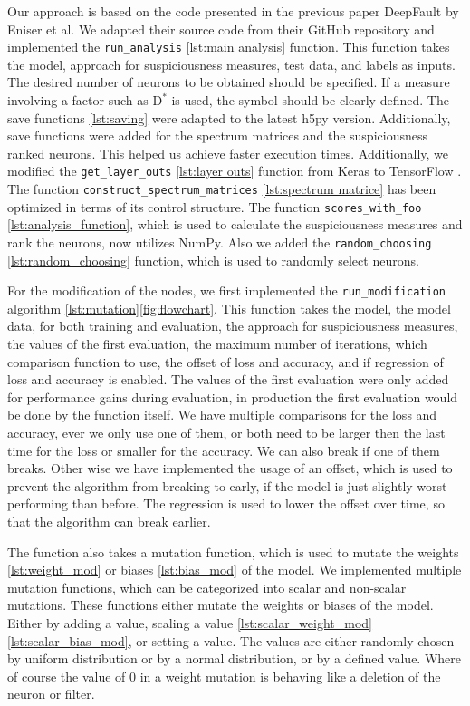 Our approach is based on the code presented in the previous paper DeepFault by Eniser et al. \cite{eniser_deepfault_2019}
We adapted their source code from their GitHub \cite{eniser_deepfault_2023} repository and implemented the \texttt{run\_analysis} \ref{lst:main analysis} function.
This function takes the model, approach for suspiciousness measures, test data, and labels as inputs.
The desired number of neurons to be obtained should be specified.
If a measure involving a factor such as $\text{D}^*$ is used, the symbol should be clearly defined.
The save functions \ref{lst:saving} were adapted to the latest h5py \cite{collette_h5pyh5py_2022} version.
Additionally, save functions were added for the spectrum matrices and the suspiciousness ranked neurons.
This helped us achieve faster execution times.
Additionally, we modified the \texttt{get\_layer\_outs} \ref{lst:layer outs} function from Keras \cite{chollet_keras_2015} to TensorFlow \cite{martin_abadi_tensorflow_2015}.
The function \texttt{construct\_spectrum\_matrices} \ref{lst:spectrum matrice} has been optimized in terms of its control structure.
The function \texttt{scores\_with\_foo} \ref{lst:analysis_function}, which is used to calculate the suspiciousness measures and rank the neurons, now utilizes NumPy.
Also we added the \texttt{random\_choosing} \ref{lst:random_choosing} function, which is used to randomly select neurons.

For the modification of the nodes, we first implemented the \texttt{run\_modification} algorithm \ref{lst:mutation}\ref{fig:flowchart}.
This function takes the model, the model data, for both training and evaluation, the approach for suspiciousness measures, the values of the first evaluation, the maximum number of iterations, which comparison function to use, the offset of loss and accuracy, and if regression of loss and accuracy is enabled.
The values of the first evaluation were only added for performance gains during evaluation, in production the first evaluation would be done by the function itself.
We have multiple comparisons for the loss and accuracy, ever we only use one of them, or both need to be larger then the last time for the loss or smaller for the accuracy.
We can also break if one of them breaks.
Other wise we have implemented the usage of an offset, which is used to prevent the algorithm from breaking to early, if the model is just slightly worst performing than before.
The regression is used to lower the offset over time, so that the algorithm can break earlier.


The function also takes a mutation function, which is used to mutate the weights \ref{lst:weight_mod} or biases \ref{lst:bias_mod} of the model.
We implemented multiple mutation functions, which can be categorized into scalar and non-scalar mutations.
These functions either mutate the weights or biases of the model.
Either by adding a value, scaling a value \ref{lst:scalar_weight_mod} \ref{lst:scalar_bias_mod}, or setting a value.
The values are either randomly chosen by uniform distribution or by a normal distribution, or by a defined value.
Where of course the value of 0 in a weight mutation is behaving like a deletion of the neuron or filter.